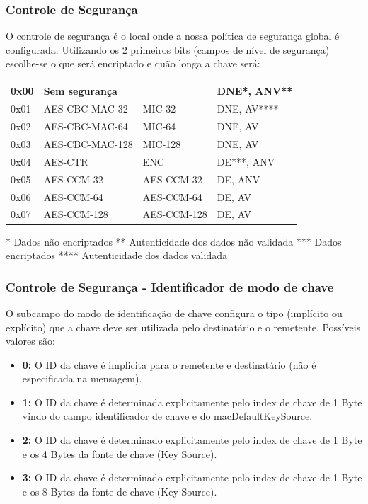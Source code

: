 \documentclass{beamer}
\begin{document}
   \frame
  {
    \frametitle{Controle de Segurança}
   O controle de segurança é o local onde a nossa política de segurança global é configurada.
   Utilizando os 2 primeiros bits (campos de nível de segurança) escolhe-se o que será encriptado e quão longa a chave será:
   \begin{table}[htb] %
   \centering   %
   \footnotesize       %
   \setlength{\arrayrulewidth}{2\arrayrulewidth}  %
   \setlength{\belowcaptionskip}{4pt}  %
   \begin{tabular}{|l|l|l|l|} %
      \hline
      0x00 & Sem segurança &  & DNE*, ANV**\\
      \hline
      0x01 & AES-CBC-MAC-32 & MIC-32 & DNE, AV****\\
      \hline
      0x02 & AES-CBC-MAC-64 & MIC-64 & DNE, AV\\
      \hline
      0x03 & AES-CBC-MAC-128 & MIC-128 & DNE, AV\\
      \hline
      0x04 & AES-CTR & ENC & DE***, ANV\\
      \hline
      0x05 & AES-CCM-32 & AES-CCM-32 & DE, ANV\\
      \hline
      0x06 & AES-CCM-64 & AES-CCM-64 & DE, AV\\
      \hline
      0x07 & AES-CCM-128  & AES-CCM-128 & DE, AV\\
      \hline
   \end{tabular}
   \label{tab:encriptacao}
\end{table}
* Dados não encriptados
** Autenticidade dos dados não validada
*** Dados encriptados
**** Autenticidade dos dados validada
  }

    \frame
  {
    \frametitle{Controle de Segurança - Identificador de modo de chave }
    O subcampo do modo de identificação de chave configura o tipo (implícito ou explícito)
    que a chave deve ser utilizada pelo destinatário e o remetente. Possíveis valores
    são:
    \begin{itemize}
      \item \textbf{0:} O ID da chave é implicita para o remetente e destinatário (não é especificada na
	    mensagem).
      \item \textbf{1:} O ID da chave é determinada explicitamente pelo index de chave de 1 Byte vindo
	    do campo identificador de chave e do macDefaultKeySource.
      \item \textbf{2:} O ID da chave é determinado explicitamente pelo index de chave de 1 Byte e os
	    4 Bytes da fonte de chave (Key Source).
      \item \textbf{3:} O ID da chave é determinado explicitamente pelo index de chave de 1 Byte e os
	    8 Bytes da fonte de chave (Key Source).
    \end{itemize}  
  }
\end{document}
